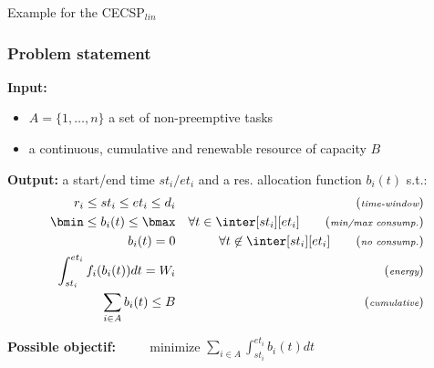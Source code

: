 \begin{frame}{Example for the CECSP$_{lin}$}
  
\end{frame}


\begin{frame}
  \frametitle{Problem statement}
  \vfill
 {\small  {\bf Input: } 
  \begin{itemize}
  \item $A=\{1,\hdots,n\}$ a set of non-preemptive tasks
  \item a continuous, cumulative and renewable resource of capacity  $B$
  \end{itemize}
  \vspace{0.5cm}
  {\bf Output:} a start/end time $st_i/et_i$ and a res. allocation function
  $b_i(t)$ s.t.:
  {\footnotesize
    \begin{align}
    r_i\le st_i\le
   et_i \le d_i & & \tag{{\it \scriptsize
                                                     time-window}}\\
    \bmin \le b_i(t) \le \bmax & & \forall t
                                                                 \in \inter[st_i][et_i] \tag{{\it \scriptsize min/max consump.}}\\
    b_i(t)=0 & &
                                               \forall t \not\in \inter[st_i][et_i] \tag{{\it \scriptsize no
                                               consump.}}\\ 
    \int_{st_i}^{et_i}f_i(b_i(t))dt=W_i
                                                 & &\tag{{\it \scriptsize energy}} \\
    \sum_{i\in A}b_i(t) \le B & & \tag{{\it
                                                                \scriptsize cumulative}}
  \end{align}
}

  \vspace{0.5cm}
{\bf Possible objectif:} $\qquad $ minimize  $\sum_{i\in A}
\int_{st_i}^{et_i} b_i(t)dt $}
\end{frame}

